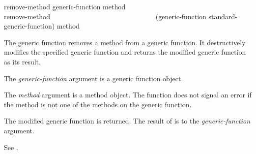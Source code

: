 \begin{defun}
remove-method generic-function method \\
remove-method~~~~~~~~~~~~~~~~~~~~~~~~~~~~~~ (generic-function standard-generic-function) method

The generic function  removes a method from a
generic function.  It destructively modifies the specified generic
function and returns the modified generic function as its result.





The {\it generic-function\/} argument is a generic function
object.

The {\it method\/} argument is a method object.  The function 
 does not signal an error if the method is not one of the
methods on the generic function.


The modified generic function is returned.  The result of  
is  to the {\it generic-function\/} argument.

See .
\end{defun}

